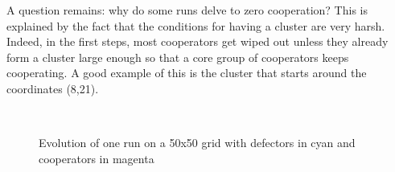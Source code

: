 \documentclass[a4paper]{article}
\begin{document}
A question remains: why do some runs delve to zero cooperation? This is
explained by the fact that the conditions for having a cluster are very harsh.
Indeed, in the first steps, most cooperators get wiped out unless they already
form a cluster large enough so that a core group of cooperators keeps
cooperating. A good example of this is the cluster that starts around the
coordinates (8,21).\\

\begin{figure}[H]
	\centering
	\\
	\caption{Evolution of one run on a 50x50 grid with defectors in cyan
	and cooperators in magenta}
	\label{50viz}
\end{figure}
\end{document}
